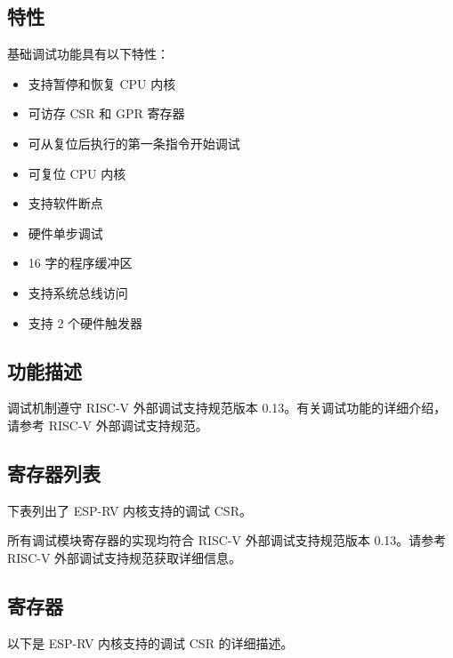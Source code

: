 \documentclass[main\_\_CN.tex]{subfiles}
\begin{document}
\subsection{特性}
\label{sec:riscvcpu-dbg-features}
基础调试功能具有以下特性：

\begin{itemize}
    \item {支持暂停和恢复 CPU 内核}
    \item {可访存 CSR 和 GPR 寄存器}
    \item {可从复位后执行的第一条指令开始调试}
    \item {可复位 CPU 内核}
    \item {支持软件断点}
    \item {硬件单步调试}
    \item {16 字的程序缓冲区}
    \item {支持系统总线访问}
    \item {支持 2 个硬件触发器}
\end{itemize}

\subsection{功能描述}
\label{sec:riscvcpu-dbg-func-descr}

调试机制遵守 RISC-V 外部调试支持规范版本 0.13。有关调试功能的详细介绍，请参考 RISC-V 外部调试支持规范。


\hypertarget{riscvcpu-dbg-reg-summ}{}
\subsection{寄存器列表}
\label{sec:riscvcpu-dbg-reg-summ}


下表列出了 ESP-RV 内核支持的调试 CSR。



所有调试模块寄存器的实现均符合 RISC-V 外部调试支持规范版本 0.13。请参考 RISC-V 外部调试支持规范获取详细信息。



\subsection{寄存器}
以下是 ESP-RV 内核支持的调试 CSR 的详细描述。


\end{document}
